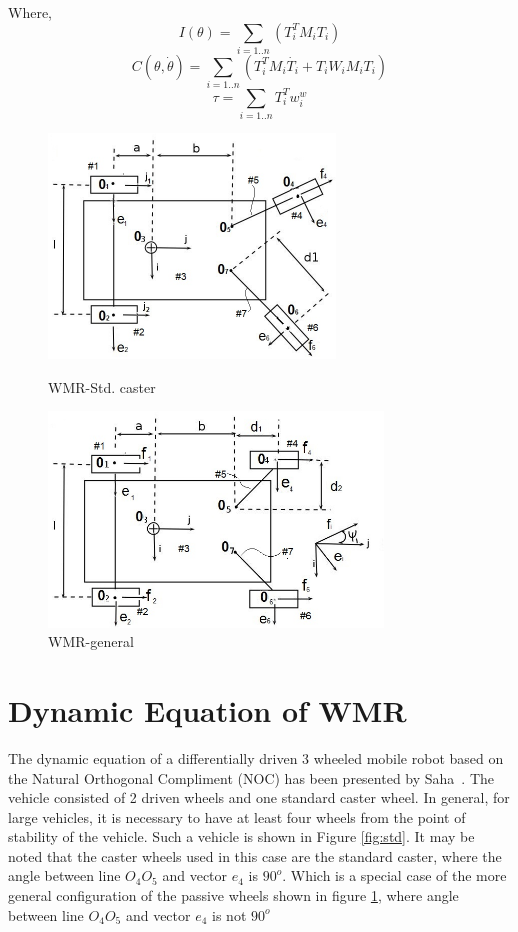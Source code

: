 Where, 
\begin{equation}
	I(\theta)=\sum_{i=1..n}(T_i^TM_iT_i)
\end{equation}
\begin{equation}
C(\theta,\dot{\theta})=\sum_{i=1..n}(T_i^T M_i\dot{T_i}+T_i W_i M_i T_i)
\end{equation}
\begin{equation}
\tau=\sum_{i=1..n}T_i^T w^w_i
\end{equation}

\begin{figure}
	\begin{minipage}[t]{0.5\textwidth}
	\centering
		\includegraphics[width=3in]{Chapter4/fig/fig1.jpg} 
		\caption{WMR-Std. caster}\label{fig:std}
	\end{minipage}
	\hfill
	\begin{minipage}[t]{0.5\textwidth}
	\centering
		\includegraphics[width=3.5in]{Chapter4/fig/fig2.jpg} 
		\caption{WMR-general}\label{fig:gen}
			\end{minipage}
\end{figure}


\section{Dynamic Equation of WMR}
\label{sec:DynamicNoSlip}
The dynamic equation of a differentially driven 3 wheeled mobile robot based on the  Natural Orthogonal Compliment (NOC) has been presented by Saha~\cite{saha1991dynamics}. The vehicle consisted of 2 driven wheels and one standard caster wheel. In general, for large vehicles, it is necessary to have at least four wheels from the point of stability of the vehicle. Such a vehicle  is shown in Figure \ref{fig:std}. It may be noted that the caster wheels used in this case are the standard caster, where the angle between line $O_4O_5$ and vector $e_4$ is  $90^o$. Which is a special case of the more general configuration of the passive wheels shown in figure \ref{fig:gen}, where angle between line $O_4O_5$ and vector $e_4$ is not $90^o$

